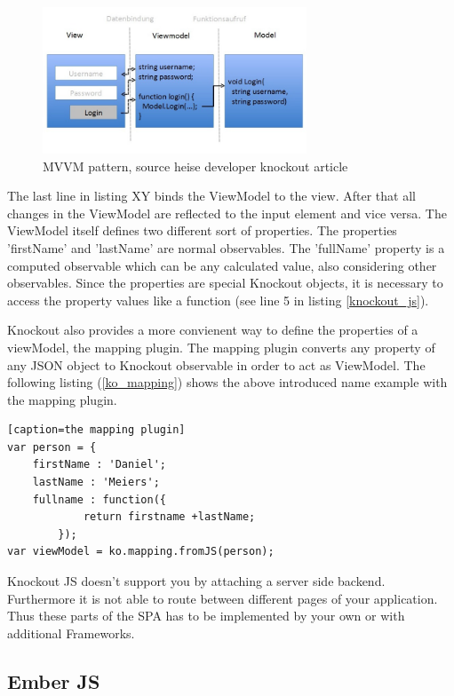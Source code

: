 \begin{figure}[h]
	\centering	
	\includegraphics[width=0.7\textwidth]{./img/mvvm.jpeg}
	\caption{MVVM pattern, source heise developer knockout article}
	\label{fig:mvvm}
\end{figure}


The last line in listing XY binds the ViewModel to the view. After that all changes in the ViewModel are reflected to the input element and vice versa. The ViewModel itself defines two different sort of properties. The properties 'firstName' and 'lastName' are normal observables. The 'fullName' property is a computed observable which can be any calculated value, also considering other observables. Since the properties are special Knockout objects, it is necessary to access the property values like a function (see line 5 in listing \ref{knockout_js}).


Knockout also provides a more convienent way to define the properties of a viewModel, the mapping plugin. The mapping plugin converts any property of any JSON object to Knockout observable in order to act as ViewModel. The following listing (\ref{ko_mapping}) shows the above introduced name example with the mapping plugin.

\begin{lstlisting}[label=ko_mapping][caption=the mapping plugin]
var person = {
	firstName : 'Daniel';
	lastName : 'Meiers';
	fullname : function({
			return firstname +lastName;
		});
var viewModel = ko.mapping.fromJS(person);
\end{lstlisting}


Knockout JS doesn't support you by attaching a server side backend. Furthermore it is not able to route between different pages of your application. Thus these parts of the SPA has to be implemented by your own or with additional Frameworks.


\subsection{Ember JS}

